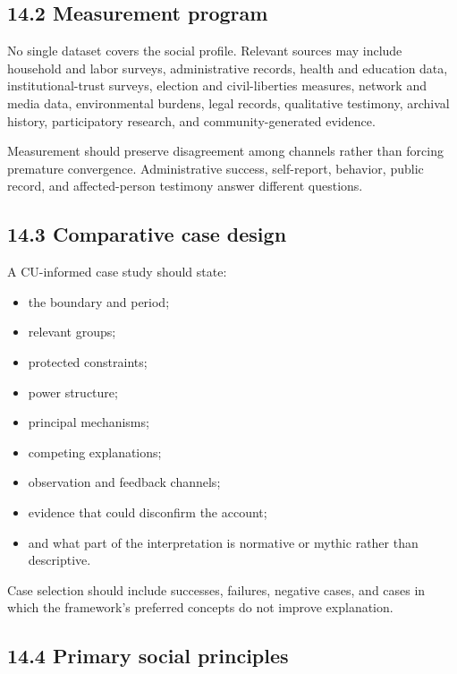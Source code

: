 \documentclass[
  11pt,
]{article}
\providecommand{\tightlist}{%
  \setlength{\itemsep}{0pt}\setlength{\parskip}{0pt}}
\begin{document}
\subsection{14.2 Measurement program}\label{measurement-program}

No single dataset covers the social profile. Relevant sources may
include household and labor surveys, administrative records, health and
education data, institutional-trust surveys, election and
civil-liberties measures, network and media data, environmental burdens,
legal records, qualitative testimony, archival history, participatory
research, and community-generated evidence.

Measurement should preserve disagreement among channels rather than
forcing premature convergence. Administrative success, self-report,
behavior, public record, and affected-person testimony answer different
questions.

\subsection{14.3 Comparative case design}\label{comparative-case-design}

A CU-informed case study should state:

\begin{itemize}
\tightlist
\item
  the boundary and period;
\item
  relevant groups;
\item
  protected constraints;
\item
  power structure;
\item
  principal mechanisms;
\item
  competing explanations;
\item
  observation and feedback channels;
\item
  evidence that could disconfirm the account;
\item
  and what part of the interpretation is normative or mythic rather than
  descriptive.
\end{itemize}

Case selection should include successes, failures, negative cases, and
cases in which the framework's preferred concepts do not improve
explanation.

\subsection{14.4 Primary social
principles}\label{primary-social-principles}
\end{document}
